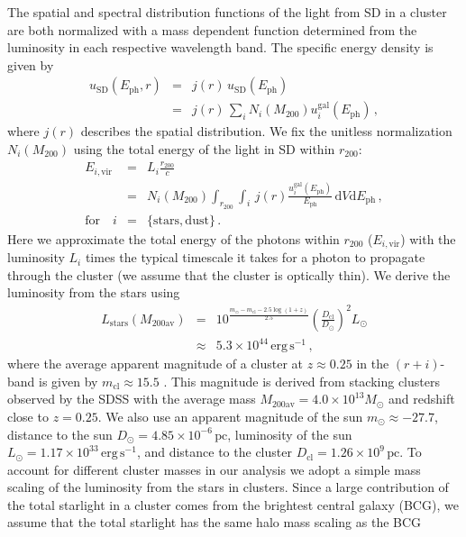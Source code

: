 \documentclass[10pt,aps,pra,reprint,amsmath,amsfonts,amssymb,showpacs]{revtex4-1}
\newcommand{\rmn}{\mathrm}
\newcommand{\ph}{\rmn{ph}}
\newcommand{\eph}{E_\ph}
\newcommand{\vir}{\rmn{vir}}
\newcommand{\gal}{\rmn{gal}}
\newcommand{\sd}{\rmn{SD}}
\newcommand{\clu}{\rmn{cl}}
\newcommand{\msun}{M_\odot}
\newcommand{\stars}{\rmn{stars}}
\newcommand{\dd}{\rmn{d}}
\newcommand{\rvir}{r_{200}}
\newcommand{\mvir}{M_{200}}
\begin{document}
The spatial and spectral distribution functions of the light from SD
in a cluster are both normalized with a mass dependent function
determined from the luminosity in each respective wavelength band. The
specific energy density is given by
\begin{eqnarray} 
u_\sd(\eph, r) &=& j(r)\,u_\sd(\eph) \nonumber\\
&=& j(r)\,\sum_i N_i(\mvir) u_i^\gal(\eph)\,,
\end{eqnarray}
where $j(r)$ describes the spatial distribution. We fix the unitless
normalization $N_i(\mvir)$ using the total energy of the light in SD
within $\rvir$:
\begin{eqnarray} 
  E_{i,\vir} &=& L_i \frac{\rvir}{c} \nonumber \\
  &=&N_i(\mvir)\int_{\rvir} \int_i \,j(r) 
  \frac{u_i^\gal(\eph)}{\eph}\,\dd V\dd \eph\,,\nonumber \\
 \rmn{for}\quad i&=&\{\rmn{stars,dust}\}\,.
\label{eq:E_SD}
\end{eqnarray}
Here we approximate the total energy of the photons within $\rvir$
($E_{i,\vir}$) with the luminosity $L_i$ \cite{2008A&A...490..547G}
times the typical timescale it takes for a photon to propagate through
the cluster (we assume that the cluster is optically thin). We derive
the luminosity from the stars using
\begin{eqnarray}
L_\stars(M_{200\rmn{av}})&=&10^{\frac{m_\odot-m_\rmn{cl}-2.5\log\left(1+z\right)}{2.5}}
\left(\frac{D_\clu}{D_\odot}\right)^2 L_\odot\nonumber\\
&\approx& 5.3\times10^{44}\,\rmn{erg}\,\rmn{s}^{-1}\,,
\label{eq:L_star}
\end{eqnarray}
where the average apparent magnitude of a cluster at $z\approx 0.25$
in the $(r+i)$-band is given by $m_\rmn{cl}\approx 15.5$
\cite{2005MNRAS.358..949Z}. This magnitude is derived from stacking
clusters observed by the SDSS with the average mass
$M_{200\rmn{av}}=4.0\times10^{13}\msun$ and redshift close to
$z=0.25$. We also use an apparent magnitude of the sun $m_\odot\approx
-27.7$, distance to the sun $D_\odot=4.85\times10^{-6}\,\rmn{pc}$,
luminosity of the sun $L_\odot=1.17\times10^{33}\,\rmn{erg\,s}^{-1}$,
and distance to the cluster $D_\clu=1.26\times10^9\,\rmn{pc}$. To
account for different cluster masses in our analysis we adopt a simple
mass scaling of the luminosity from the stars in clusters. Since a
large contribution of the total starlight in a cluster comes from the
brightest central galaxy (BCG), we assume that the total starlight has
the same halo mass scaling as the BCG \cite{2010ApJ...713.1037H}
\end{document}
